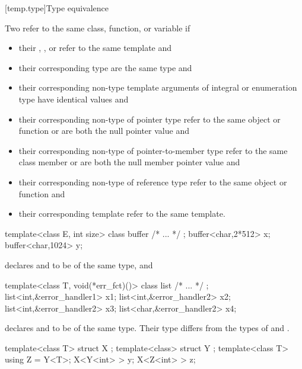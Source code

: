 [temp.type]{Type equivalence}

\pnum
{}%
Two  refer to the same
class, function, or variable if
\begin{itemize}
\item {their ,
, or 
refer to the same template and}
\item {their corresponding type  are the
same type and}
\item {their corresponding non-type
template arguments of
integral or enumeration type have identical values and}
\item {their corresponding non-type  of
pointer type refer to the same object or function or are both the null
pointer value and}
\item {their corresponding non-type  of
pointer-to-member type refer to the same class member or are both the null member
pointer value and}
\item {their corresponding non-type  of
reference type refer to the same object or function and}
\item {their corresponding template  refer
to the same template.}
\end{itemize}
\enterexample

\begin{codeblock}
template<class E, int size> class buffer { /* ... */ };
buffer<char,2*512> x;
buffer<char,1024> y;
\end{codeblock}

declares
and
to be of the same type, and

\begin{codeblock}
template<class T, void(*err_fct)()> class list { /* ... */ };
list<int,&error_handler1> x1;
list<int,&error_handler2> x2;
list<int,&error_handler2> x3;
list<char,&error_handler2> x4;
\end{codeblock}

declares
and
to be of the same type.
Their type differs from the types of
and
.

\begin{codeblock}
template<class T> struct X { };
template<class> struct Y { };
template<class T> using Z = Y<T>;
X<Y<int> > y;
X<Z<int> > z;
\end{codeblock}


